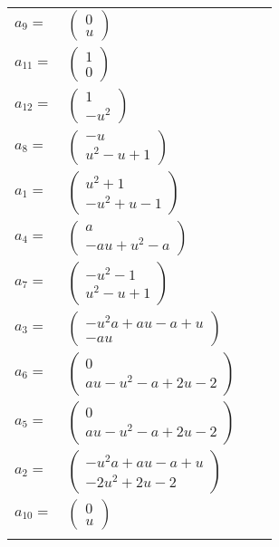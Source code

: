 \documentclass[1p]{elsarticle_modified}
\theoremstyle{definition}
\begin{document}
\begin{tabular}{m{7pt} m{180pt} m{7pt} m{180pt} }
\flushright $a_{9}=$&$\begin{pmatrix}0\\u\end{pmatrix}$ \\
\flushright $a_{11}=$&$\begin{pmatrix}1\\0\end{pmatrix}$ \\
\flushright $a_{12}=$&$\begin{pmatrix}1\\- u^2\end{pmatrix}$ \\
\flushright $a_{8}=$&$\begin{pmatrix}- u\\u^2- u+1\end{pmatrix}$ \\
\flushright $a_{1}=$&$\begin{pmatrix}u^2+1\\- u^2+u-1\end{pmatrix}$ \\
\flushright $a_{4}=$&$\begin{pmatrix}a\\- a u+u^2- a\end{pmatrix}$ \\
\flushright $a_{7}=$&$\begin{pmatrix}- u^2-1\\u^2- u+1\end{pmatrix}$ \\
\flushright $a_{3}=$&$\begin{pmatrix}- u^2 a+a u- a+u\\- a u\end{pmatrix}$ \\
\flushright $a_{6}=$&$\begin{pmatrix}0\\a u- u^2- a+2 u-2\end{pmatrix}$ \\
\flushright $a_{5}=$&$\begin{pmatrix}0\\a u- u^2- a+2 u-2\end{pmatrix}$ \\
\flushright $a_{2}=$&$\begin{pmatrix}- u^2 a+a u- a+u\\-2 u^2+2 u-2\end{pmatrix}$ \\
\flushright $a_{10}=$&$\begin{pmatrix}0\\u\end{pmatrix}$\\&\end{tabular}
\end{document}
